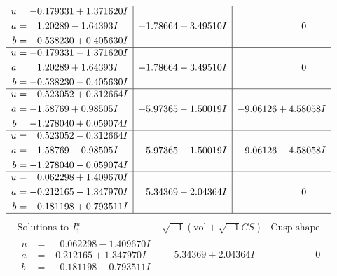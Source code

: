 \documentclass[1p]{elsarticle_modified}
\theoremstyle{definition}
\newcommand{\I}{\sqrt{-1}}
\begin{document}
$$\begin{array}{c|c|c}
\begin{aligned}
u &= -0.179331 + 1.371620 I \\
a &= \phantom{-}1.20289 - 1.64393 I \\
b &= -0.538230 + 0.405630 I\end{aligned}
 & -1.78664 + 3.49510 I & \phantom{-0.000000 } 0 \\ \hline\begin{aligned}
u &= -0.179331 - 1.371620 I \\
a &= \phantom{-}1.20289 + 1.64393 I \\
b &= -0.538230 - 0.405630 I\end{aligned}
 & -1.78664 - 3.49510 I & \phantom{-0.000000 } 0 \\ \hline\begin{aligned}
u &= \phantom{-}0.523052 + 0.312664 I \\
a &= -1.58769 + 0.98505 I \\
b &= -1.278040 + 0.059074 I\end{aligned}
 & -5.97365 - 1.50019 I & -9.06126 + 4.58058 I \\ \hline\begin{aligned}
u &= \phantom{-}0.523052 - 0.312664 I \\
a &= -1.58769 - 0.98505 I \\
b &= -1.278040 - 0.059074 I\end{aligned}
 & -5.97365 + 1.50019 I & -9.06126 - 4.58058 I \\ \hline\begin{aligned}
u &= \phantom{-}0.062298 + 1.409670 I \\
a &= -0.212165 - 1.347970 I \\
b &= \phantom{-}0.181198 + 0.793511 I\end{aligned}
 & \phantom{-}5.34369 - 2.04364 I & \phantom{-0.000000 } 0\\
 \hline 
 \end{array}$$\newpage$$\begin{array}{c|c|c}  
\text{Solutions to }I^u_{1}& \I (\text{vol} + \sqrt{-1}CS) & \text{Cusp shape}\\
 \hline 
\begin{aligned}
u &= \phantom{-}0.062298 - 1.409670 I \\
a &= -0.212165 + 1.347970 I \\
b &= \phantom{-}0.181198 - 0.793511 I\end{aligned}
 & \phantom{-}5.34369 + 2.04364 I & \phantom{-0.000000 } 0 \\ \hline\begin{aligned}

\end{aligned}
\end{array}$$
\end{document}
